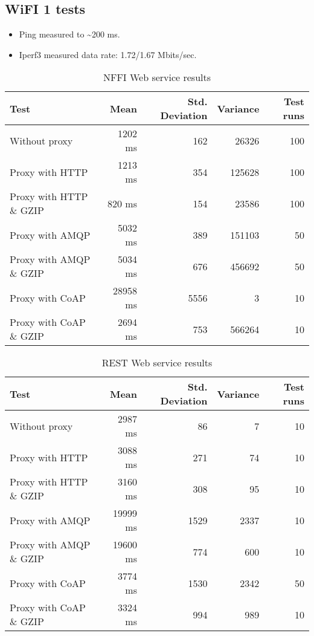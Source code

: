 \begin{appendices}
\section{WiFI 1 tests}

\begin{itemize}
	\item Ping measured to \textasciitilde 200 ms.
	\item Iperf3 measured data rate: 1.72/1.67 Mbits/sec.
\end{itemize}

\begin{table}[H]
\begin{tabular}{| l | r | r | r | r |}
\hline
  \textbf{Test} & \textbf{Mean} & \textbf{Std. Deviation} & \textbf{Variance} & \textbf{Test runs}\\ \hline
  Without proxy & 1202 ms & 162 & 26326 & 100 \\ \hline
  Proxy with HTTP & 1213 ms & 354 & 125628 & 100 \\ \hline
  Proxy with HTTP \& GZIP & 820 ms & 154 & 23586 & 100 \\ \hline
  Proxy with AMQP & 5032 ms & 389 & 151103 & 50 \\ \hline
  Proxy with AMQP \& GZIP & 5034 ms & 676 & 456692 & 50\\ \hline
  Proxy with CoAP & 28958 ms & 5556 & 3 & 10 \\ \hline
  Proxy with CoAP \& GZIP & 2694 ms & 753 & 566264 & 10 \\ \hline
\end{tabular}
\caption{NFFI Web service results}
\end{table}


\begin{table}[H]
\begin{tabular}{| l | r | r | r | r |}
\hline
  \textbf{Test} & \textbf{Mean} & \textbf{Std. Deviation} & \textbf{Variance} & \textbf{Test runs}\\ \hline
  Without proxy & 2987 ms & 86 & 7 & 10 \\ \hline
  Proxy with HTTP & 3088 ms & 271 & 74 & 10 \\ \hline
  Proxy with HTTP \& GZIP & 3160 ms & 308 & 95 & 10 \\ \hline
  Proxy with AMQP & 19999 ms & 1529 & 2337 & 10 \\ \hline
  Proxy with AMQP \& GZIP & 19600 ms & 774 & 600 & 10\\ \hline
  Proxy with CoAP & 3774 ms & 1530 & 2342 & 50 \\ \hline
  Proxy with CoAP \& GZIP & 3324 ms & 994 & 989 & 10 \\ \hline
\end{tabular}
\caption{REST Web service results}
\end{table}





\end{appendices}
